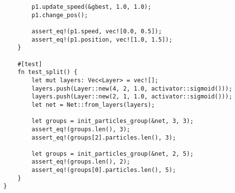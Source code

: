 \begin{code}
\begin{verbatim}
        p1.update_speed(&gbest, 1.0, 1.0);
        p1.change_pos();

        assert_eq!(p1.speed, vec![0.0, 0.5]);
        assert_eq!(p1.position, vec![1.0, 1.5]);
    }

    #[test]
    fn test_split() {
        let mut layers: Vec<Layer> = vec![];
        layers.push(Layer::new(4, 2, 1.0, activator::sigmoid()));
        layers.push(Layer::new(2, 1, 1.0, activator::sigmoid()));
        let net = Net::from_layers(layers);

        let groups = init_particles_group(&net, 3, 3);
        assert_eq!(groups.len(), 3);
        assert_eq!(groups[2].particles.len(), 3);

        let groups = init_particles_group(&net, 2, 5);
        assert_eq!(groups.len(), 2);
        assert_eq!(groups[0].particles.len(), 5);
    }
}

\end{verbatim}
\end{code}


